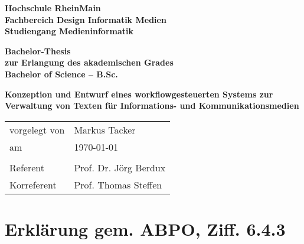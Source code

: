 \documentclass[11pt,a4paper]{article}
\begin{document}
\setmainfont[Mapping=tex-text]{ITC Stone Sans Std}





\begin{center}

\begin{small}

\textbf{Hochschule RheinMain\\Fachbereich Design Informatik Medien\\Studiengang Medieninformatik}

\vspace{1cm}

\textbf{Bachelor-Thesis\\zur Erlangung des akademischen Grades\\Bachelor of Science – B.Sc.}

\end{small}

\vspace{2cm}

\begin{huge}

\textbf{Konzeption und Entwurf eines workflowgesteuerten Systems zur Verwaltung von Texten für Informations- und Kommunikationsmedien}

\end{huge}

\end{center}

\setmainfont[Mapping=tex-text,BoldFont={Vollkorn-Bold},ItalicFont={Vollkorn-Italic},BoldItalicFont={Vollkorn-Bold Italic}]{Vollkorn}
\setsansfont[Mapping=tex-text]{ITC Stone Sans Std}

\vspace{8cm}

\begin{tabular}{@{}l l}
vorgelegt von & Markus Tacker\\
am & \today\\
& \\
Referent & Prof. Dr. Jörg Berdux\\
Korreferent & Prof. Thomas Steffen
\end{tabular}

\pagebreak

\section*{Erklärung gem. ABPO, Ziff. 6.4.3}
\end{document}
